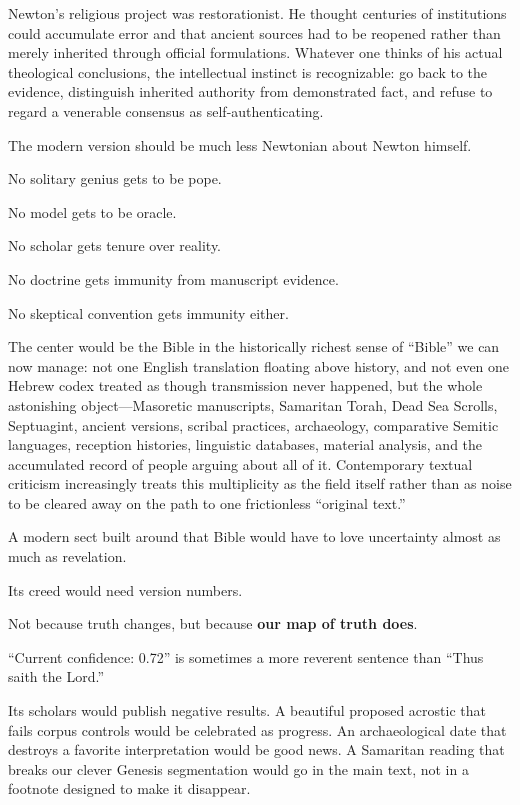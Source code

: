 Newton's religious project was restorationist. He thought centuries of institutions could accumulate error and that ancient sources had to be reopened rather than merely inherited through official formulations. Whatever one thinks of his actual theological conclusions, the intellectual instinct is recognizable: go back to the evidence, distinguish inherited authority from demonstrated fact, and refuse to regard a venerable consensus as self-authenticating.\cite{NewtonProject}

The modern version should be much less Newtonian about Newton himself.

No solitary genius gets to be pope.

No model gets to be oracle.

No scholar gets tenure over reality.

No doctrine gets immunity from manuscript evidence.

No skeptical convention gets immunity either.

The center would be the Bible in the historically richest sense of ``Bible'' we can now manage: not one English translation floating above history, and not even one Hebrew codex treated as though transmission never happened, but the whole astonishing object---Masoretic manuscripts, Samaritan Torah, Dead Sea Scrolls, Septuagint, ancient versions, scribal practices, archaeology, comparative Semitic languages, reception histories, linguistic databases, material analysis, and the accumulated record of people arguing about all of it. Contemporary textual criticism increasingly treats this multiplicity as the field itself rather than as noise to be cleared away on the path to one frictionless ``original text.''\cite{Longacre2025,Hjelm2020}

A modern sect built around that Bible would have to love uncertainty almost as much as revelation.

Its creed would need version numbers.

Not because truth changes, but because \textbf{our map of truth does}.

``Current confidence: 0.72'' is sometimes a more reverent sentence than ``Thus saith the Lord.''

Its scholars would publish negative results. A beautiful proposed acrostic that fails corpus controls would be celebrated as progress. An archaeological date that destroys a favorite interpretation would be good news. A Samaritan reading that breaks our clever Genesis segmentation would go in the main text, not in a footnote designed to make it disappear.

